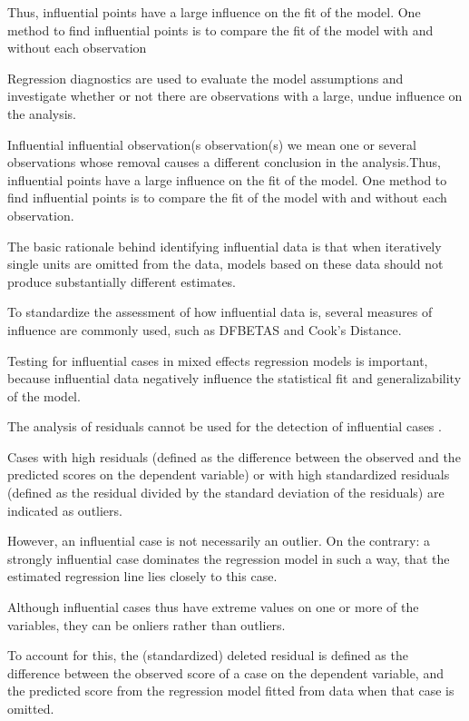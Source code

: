 Thus, influential points have a large influence on the fit of the model. One method to find influential points is to compare the fit of the model with and without each observation




Regression diagnostics are used to evaluate the model assumptions and investigate whether or not there are observations with a large, undue influence on the analysis.

Influential influential observation(s observation(s) we mean one or several observations whose
removal causes a different conclusion in the analysis.Thus, influential points have a large influence on the fit of the model. One method to find influential points is to compare the fit of the model with and without each observation.


The basic rationale behind identifying influential data is that when iteratively single units are omitted from the data, models based on these data should not produce substantially different estimates. 

To standardize the assessment of how influential data is, several measures of influence are commonly used, such as DFBETAS 
and Cook’s Distance.

Testing for influential cases in mixed effects regression models is important, because influential data negatively 
influence the statistical fit and generalizability of the model.


The analysis of residuals cannot be used for the detection of influential cases \citep{crawley2012r}. 

Cases with high residuals (defined as the difference between the observed and the predicted scores on the dependent
variable) or with high standardized residuals (defined as the residual divided by the standard deviation
of the residuals) are indicated as outliers.

However, an influential case is not necessarily an outlier. On the contrary: a strongly influential case dominates
the regression model in such a way, that the estimated regression line lies closely to this case. 


Although influential cases thus have extreme values on one or more of the variables, they can be onliers
rather than outliers. 

To account for this, the (standardized) deleted residual is defined as the difference between
the observed score of a case on the dependent variable, and the predicted score from the regression
model fitted from data when that case is omitted.


